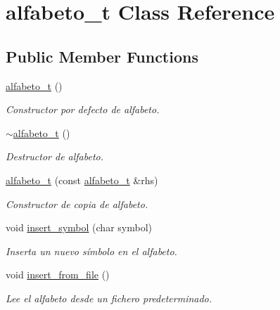 \hypertarget{classalfabeto__t}{}\section{alfabeto\+\_\+t Class Reference}
\label{classalfabeto__t}
\subsection*{Public Member Functions}
\begin{DoxyCompactItemize}
\item 
\mbox{\label{classalfabeto__t_a018d4a8ea7bcdb89923bd71976c56605}} 
\hyperlink{classalfabeto__t_a018d4a8ea7bcdb89923bd71976c56605}{alfabeto\+\_\+t} ()
\begin{DoxyCompactList}\small\item\em Constructor por defecto de alfabeto. \end{DoxyCompactList}\item 
\mbox{\label{classalfabeto__t_a3b6e5bc1dee7555dbc4c402794d92758}} 
\hyperlink{classalfabeto__t_a3b6e5bc1dee7555dbc4c402794d92758}{$\sim$alfabeto\+\_\+t} ()
\begin{DoxyCompactList}\small\item\em Destructor de alfabeto. \end{DoxyCompactList}\item 
\hyperlink{classalfabeto__t_a4ee286fd88a31f2b3f8e0ed62e652d5c}{alfabeto\+\_\+t} (const \hyperlink{classalfabeto__t}{alfabeto\+\_\+t} \&rhs)
\begin{DoxyCompactList}\small\item\em Constructor de copia de alfabeto. \end{DoxyCompactList}\item 
void \hyperlink{classalfabeto__t_a9239138c9b00eb97c332c48e4e95628e}{insert\+\_\+symbol} (char symbol)
\begin{DoxyCompactList}\small\item\em Inserta un nuevo símbolo en el alfabeto. \end{DoxyCompactList}\item 
\mbox{\label{classalfabeto__t_ac08097cd03e8dfbb6ecfba3c74469a3a}} 
void \hyperlink{classalfabeto__t_ac08097cd03e8dfbb6ecfba3c74469a3a}{insert\+\_\+from\+\_\+file} ()
\begin{DoxyCompactList}\small\item\em Lee el alfabeto desde un fichero predeterminado. \end{DoxyCompactList}\item 

\end{DoxyCompactItemize}
